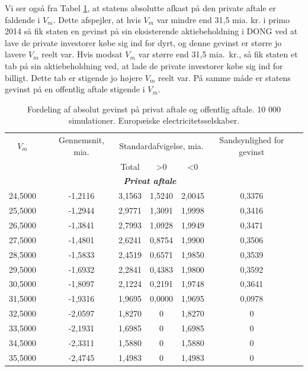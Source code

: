 \documentclass{article}
\begin{document}
Vi ser også fra Tabel \ref{tab:abs_fordeling}, at statens absolutte afkast på den private aftale er faldende i $V_m$. Dette afspejler, at hvis $V_m$ var mindre end 31,5 mia. kr. i primo 2014 så fik staten en gevinst på sin eksisterende aktiebeholdning i DONG ved at lave de private investorer købe sig ind for dyrt, og denne gevinst er større jo lavere $V_m$ reelt var. Hvis modsat $V_m$ var større end 31,5 mia.\ kr., så fik staten et tab på sin aktiebeholdning ved, at lade de private investorer købe sig ind for billigt. Dette tab er stigende jo højere $V_m$ reelt var. På samme måde er statens gevinst på en offentlig aftale stigende i $V_m$.

\begin{table}[h]
	\caption{Fordeling af absolut gevinst p\aa{} privat aftale og offentlig aftale. 10 000 simulationer. Europæiske electricitetsselskaber.}
	\label{tab:abs_fordeling}
\begin{center}
	\begin{tabular}{cXcccccr}
	\toprule[1pt] 
	$V_m$ && Gennemsnit, mia. & \multicolumn{3}{c}{Standardafvigelse, mia.}  & Sandsynlighed for gevinst\\
	& & &Total & >0 & <0 \\
	\hline 
	\multicolumn{7}{c}{\emph{\textbf{Privat aftale}}} \\
24{,}5000&&-1{,}2116& 3{,}1563& 1{,}5240& 2{,}0045& 0{,}3376\\
25{,}5000&&-1{,}2944& 2{,}9771& 1{,}3091& 1{,}9998& 0{,}3416\\
26{,}5000&&-1{,}3841& 2{,}7993& 1{,}0928& 1{,}9949& 0{,}3471\\
27{,}5000&&-1{,}4801& 2{,}6241& 0{,}8754& 1{,}9900& 0{,}3506\\
28{,}5000&&-1{,}5833& 2{,}4519& 0{,}6571& 1{,}9850& 0{,}3539\\
29{,}5000&&-1{,}6932& 2{,}2841& 0{,}4383& 1{,}9800& 0{,}3592\\
30{,}5000&&-1{,}8097& 2{,}1224& 0{,}2191& 1{,}9748& 0{,}3641\\
31{,}5000&&-1{,}9316& 1{,}9695& 0{,}0000& 1{,}9695& 0{,}0978\\
32{,}5000&&-2{,}0597& 1{,}8270&0& 1{,}8270&0\\
33{,}5000&&-2{,}1931& 1{,}6985&0& 1{,}6985&0\\
34{,}5000&&-2{,}3311& 1{,}5880&0& 1{,}5880&0\\
35{,}5000&&-2{,}4745& 1{,}4983&0& 1{,}4983&0\\

\end{tabular}
\end{center}
\end{table}
\end{document}
